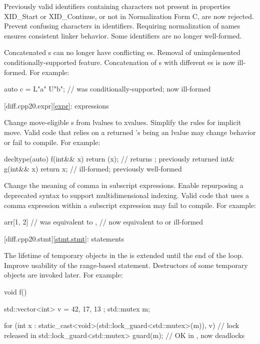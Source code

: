 \change
Previously valid identifiers containing characters
not present in  properties XID_Start or XID_Continue, or
not in Normalization Form C, are now rejected.
\rationale
Prevent confusing characters in identifiers.
Requiring normalization of names ensures consistent linker behavior.
\effect
Some identifiers are no longer well-formed.

\change
Concatenated s can no longer have
conflicting es.
\rationale
Removal of unimplemented conditionally-supported feature.
\effect
Concatenation of s
with different es
is now ill-formed.
For example:
\begin{codeblock}
auto c = L"a" U"b";             // was conditionally-supported; now ill-formed
\end{codeblock}

[diff.cpp20.expr]{\ref{expr}: expressions}

\change
Change move-eligible s from lvalues to xvalues.
\rationale
Simplify the rules for implicit move.
\effect
Valid \CppXX{} code that relies on a returned 's
being an lvalue may change behavior or fail to compile.
For example:
\begin{codeblock}
decltype(auto) f(int&& x) { return (x); }       // returns ; previously returned 
int& g(int&& x) { return x; }                   // ill-formed; previously well-formed
\end{codeblock}

\change
Change the meaning of comma in subscript expressions.
\rationale
Enable repurposing a deprecated syntax to support multidimensional indexing.
\effect
Valid \CppXX{} code that uses a comma expression within a
subscript expression may fail to compile.
For example:
\begin{codeblock}
arr[1, 2]               // was equivalent to ,
                        // now equivalent to  or ill-formed
\end{codeblock}

[diff.cpp20.stmt]{\ref{stmt.stmt}: statements}

\change
The lifetime of temporary objects in the 
is extended until the end of the loop.
\rationale
Improve usability of the range-based  statement.
\effect
Destructors of some temporary objects are invoked later.
For example:
\begin{codeblock}
void f() {
  std::vector<int> v = { 42, 17, 13 };
  std::mutex m;

  for (int x :
       static_cast<void>(std::lock_guard<std::mutex>(m)), v) {  // lock released in \CppXX
    std::lock_guard<std::mutex> guard(m);                       // OK in \CppXX, now deadlocks
  }
}
\end{codeblock}

